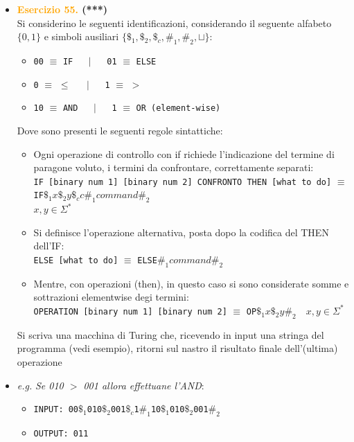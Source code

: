 \documentclass[a4paper,10pt]{article}
\begin{document}
{\begin{itemize}[label=, leftmargin=0pt]
    \item \textbf{\textcolor{orange}{Esercizio 55.} (***)}\\ 
    Si considerino le seguenti identificazioni, considerando il seguente alfabeto $\{0,1\}$ e simboli ausiliari $\{\$_1,\$_2,\$_c,\#_1,\#_2,\sqcup\}$:
    \begin{itemize}[label=\textbullet]
        \item \texttt{00} $\equiv$ \texttt{IF} $\quad \mid \quad $ \texttt{01} $\equiv$ \texttt{ELSE}
        \item \texttt{0} $\equiv$ \texttt{$\leq$} $\quad \mid \quad $ \texttt{1} $\equiv$ \texttt{$>$}
        \item \texttt{10} $\equiv$ \texttt{AND} $\quad \mid \quad $ \texttt{1} $\equiv$ \texttt{OR (element-wise)}
    \end{itemize}
    Dove sono presenti le seguenti regole sintattiche:
    \begin{itemize}[label=\textbullet]
        \item Ogni operazione di controllo con if richiede l'indicazione del termine di paragone voluto, i termini da confrontare, correttamente separati:\\ \texttt{IF [binary num 1]  [binary num 2] CONFRONTO THEN [what to do]} $\equiv$ 
        \texttt{IF$\$_1x\$_2y\$_cc\#_1command\#_2$} \\{$x,y\in\Sigma^*$}
        \item Si definisce l'operazione alternativa, posta dopo la codifica del THEN dell'IF:\\ \texttt{ELSE [what to do]} $\equiv$ \texttt{ELSE$\#_1command\#_2$}
        \item Mentre, con operazioni (then), in questo caso si sono considerate somme e sottrazioni elementwise degi termini:\\ \texttt{OPERATION [binary num 1] [binary num 2]} $\equiv$ 
        \texttt{OP$\$_1x\$_2y\#_2 \quad x,y\in\Sigma^*$}
        
    \end{itemize}
    Si scriva una macchina di Turing che, ricevendo in input una stringa del programma (vedi esempio), ritorni sul nastro il risultato finale dell'(ultima) operazione

\item \textit{e.g.} \textit{Se 010 $>$ 001 allora effettuane l'AND}: \begin{itemize} \item \texttt{INPUT: 00$\$_1$010$\$_2$001$\$_c$1$\#_1$10$\$_1$010$\$_2$001$\#_2$} \item \texttt{OUTPUT: 011} \end{itemize}


\end{itemize}}
\end{document}

